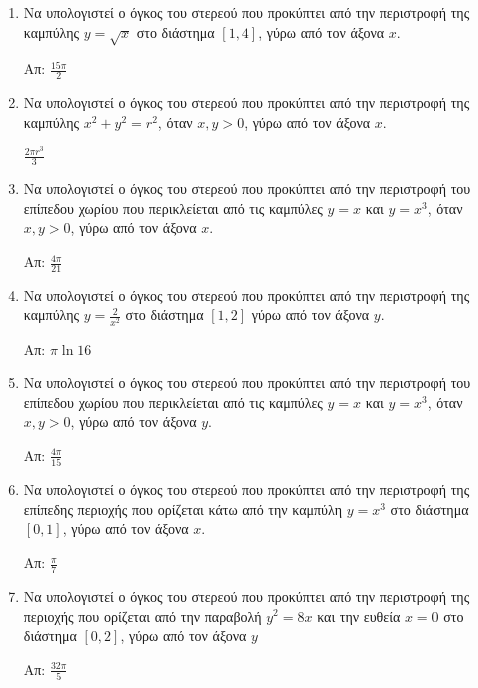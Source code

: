 \documentclass[a4paper,table]{report}
\begin{document}
\begin{center}
\end{center}

\vspace{\baselineskip}

\begin{enumerate}
  \item Να υπολογιστεί ο όγκος του στερεού που προκύπτει από την περιστροφή της καμπύλης $y=\sqrt{x}$ στο διάστημα $[1,4]$, γύρω από τον άξονα $x$.

  \hfill Απ: $\frac{15\pi}{2}$

  \item Να υπολογιστεί ο όγκος του στερεού που προκύπτει από την περιστροφή της καμπύλης $x^{2}+y^{2}=r^{2}$, όταν $x,y>0$, γύρω από τον άξονα $x$.

  \hfill $\frac{2\pi r^{3}}{3}$

  \item  Να υπολογιστεί ο όγκος του στερεού που προκύπτει από την περιστροφή του επίπεδου χωρίου που περικλείεται από τις καμπύλες $y=x$ και $y=x^{3}$, όταν $x,y>0$, γύρω από τον άξονα $x$.

  \hfill Απ: $\frac{4\pi}{21}$


  \item  Να υπολογιστεί ο όγκος του στερεού που προκύπτει από την περιστροφή της καμπύλης $y=\frac{2}{x^{2}}$ στο διάστημα $[1,2]$ γύρω από τον άξονα $y$.

  \hfill Απ: $\pi\ln 16$

  \item  Να υπολογιστεί ο όγκος του στερεού που προκύπτει από την περιστροφή του επίπεδου χωρίου που περικλείεται από τις καμπύλες $y=x$ και $y=x^{3}$, όταν $x,y>0$, γύρω από τον άξονα $y$.

  \hfill Απ: $\frac{4\pi}{15}$

   \item Να υπολογιστεί ο όγκος του στερεού που προκύπτει από την περιστροφή της επίπεδης περιοχής που ορίζεται κάτω από την καμπύλη $y=x^{3}$ στο διάστημα $[0,1]$, γύρω από τον άξονα $x$.

   \hfill Απ: $\frac{\pi}{7}$

   \item  Να υπολογιστεί ο όγκος του στερεού που προκύπτει από την περιστροφή της περιοχής που ορίζεται από την παραβολή $y^{2}=8x$ και την ευθεία $x=0$ στο διάστημα $[0,2]$, γύρω από τον άξονα $y$

   \hfill Απ: $\frac{32\pi}{5}$


\end{enumerate}
\end{document}
